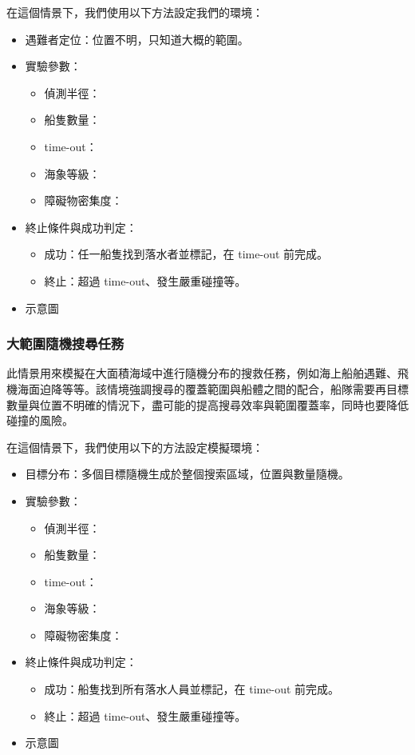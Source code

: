 \documentclass[12pt,a4paper]{ctexart}
\begin{document}
在這個情景下，我們使用以下方法設定我們的環境：
\begin{itemize}
    \item 遇難者定位：位置不明，只知道大概的範圍。
    \item 實驗參數：
    \begin{itemize}
        \item 偵測半徑：
        \item 船隻數量：
        \item time-out：
        \item 海象等級：
        \item 障礙物密集度：
    \end{itemize}
    \item 終止條件與成功判定：
    \begin{itemize}
        \item 成功：任一船隻找到落水者並標記，在 time-out 前完成。
        \item 終止：超過 time-out、發生嚴重碰撞等。
    \end{itemize}
    \item 示意圖
\end{itemize}

\subsubsection{大範圍隨機搜尋任務}
此情景用來模擬在大面積海域中進行隨機分布的搜救任務，例如海上船舶遇難、飛機海面迫降等等。該情境強調搜尋的覆蓋範圍與船體之間的配合，船隊需要再目標數量與位置不明確的情況下，盡可能的提高搜尋效率與範圍覆蓋率，同時也要降低碰撞的風險。

在這個情景下，我們使用以下的方法設定模擬環境：
\begin{itemize}
    \item 目標分布：多個目標隨機生成於整個搜索區域，位置與數量隨機。
    \item 實驗參數：
    \begin{itemize}
        \item 偵測半徑：
        \item 船隻數量：
        \item time-out：
        \item 海象等級：
        \item 障礙物密集度：
    \end{itemize}
    \item 終止條件與成功判定：
    \begin{itemize}
        \item 成功：船隻找到所有落水人員並標記，在 time-out 前完成。
        \item 終止：超過 time-out、發生嚴重碰撞等。
    \end{itemize}
    \item 示意圖
\end{itemize}
\end{document}
